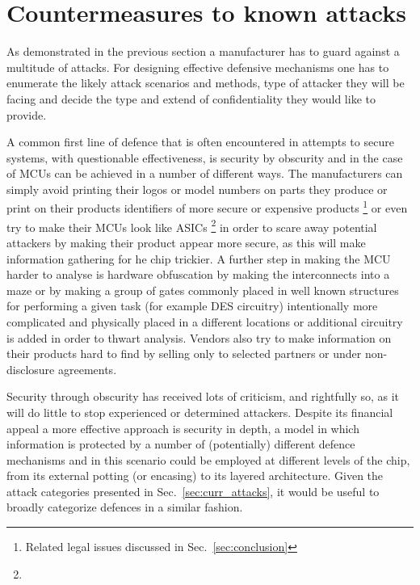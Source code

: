 \section{Countermeasures to known attacks}
\label{sec:defenses}

As demonstrated in the previous section a manufacturer has to guard against a multitude of attacks. For designing effective defensive mechanisms one has to enumerate the likely attack scenarios and methods, type of attacker they will be facing and decide the type and extend of confidentiality they would like to provide\citep{sergei:thesis}\citep{kocher:DPA}.

A common first line of defence that is often encountered in attempts to secure systems, with questionable effectiveness, is security by obscurity and in the case of MCUs can be achieved in a number of different ways. The manufacturers can simply avoid printing their logos or model numbers on parts they produce or print on their products identifiers of more secure or expensive products \footnote{Related legal issues discussed in Sec.~\ref{sec:conclusion}} or even try to make their MCUs look like ASICs \footnote{} in order to scare away potential attackers by making their product appear more secure\citep{sergei:thesis}\citep{hwre}, as this will make information gathering for he chip trickier. A further step in making the MCU harder to analyse is hardware obfuscation by making the interconnects into a maze \citep{hwre} or by making a group of gates commonly placed in well known structures for performing a given task (for example DES circuitry) intentionally more complicated and physically placed in a different locations or additional circuitry is added in order to thwart analysis\citep{anderson:cautionary_note}. Vendors also try to make information on their products hard to find by selling only to selected partners or under non-disclosure agreements\citep{sergei:thesis}.

Security through obscurity has received lots of criticism, and rightfully so, as it will do little to stop experienced or determined attackers. Despite its financial appeal a more effective approach is security in depth, a model in which information is protected by a number of (potentially) different defence mechanisms and in this scenario could be employed at different levels of the chip, from its external potting (or encasing) to its layered architecture. Given the attack categories presented in Sec.~\ref{sec:curr_attacks}, it would be useful to broadly categorize defences in a similar fashion.

